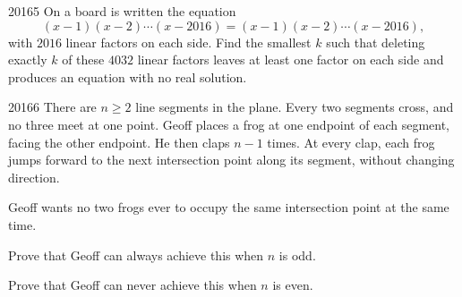 \begin{problem}{2016}{5}
On a board is written the equation
\[
    (x-1)(x-2)\cdots(x-2016)
    =(x-1)(x-2)\cdots(x-2016),
\]
with $2016$ linear factors on each side. Find the smallest $k$ such that deleting exactly $k$ of these $4032$ linear factors leaves at least one factor on each side and produces an equation with no real solution.
\end{problem}

\begin{problem}{2016}{6}
There are $n\geq2$ line segments in the plane. Every two segments cross, and no three meet at one point. Geoff places a frog at one endpoint of each segment, facing the other endpoint. He then claps $n-1$ times. At every clap, each frog jumps forward to the next intersection point along its segment, without changing direction.

Geoff wants no two frogs ever to occupy the same intersection point at the same time.
\begin{problemsubparts}
    \item Prove that Geoff can always achieve this when $n$ is odd.
    \item Prove that Geoff can never achieve this when $n$ is even.
\end{problemsubparts}
\end{problem}
